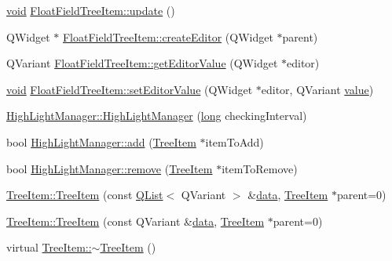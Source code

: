\begin{DoxyCompactItemize}
\item 
\hyperlink{group___u_a_v_objects_plugin_ga444cf2ff3f0ecbe028adce838d373f5c}{void} \hyperlink{group___u_a_v_object_browser_plugin_gaf8663356ac74e46312ee8bdfe6470d74}{Float\-Field\-Tree\-Item\-::update} ()
\item 
Q\-Widget $\ast$ \hyperlink{group___u_a_v_object_browser_plugin_ga2762101ef0435023c73583b23393a8c2}{Float\-Field\-Tree\-Item\-::create\-Editor} (Q\-Widget $\ast$parent)
\item 
Q\-Variant \hyperlink{group___u_a_v_object_browser_plugin_gac22e37813e460949e795d4b18c110293}{Float\-Field\-Tree\-Item\-::get\-Editor\-Value} (Q\-Widget $\ast$editor)
\item 
\hyperlink{group___u_a_v_objects_plugin_ga444cf2ff3f0ecbe028adce838d373f5c}{void} \hyperlink{group___u_a_v_object_browser_plugin_gadf07cae542668ec439bf1514f07e4983}{Float\-Field\-Tree\-Item\-::set\-Editor\-Value} (Q\-Widget $\ast$editor, Q\-Variant \hyperlink{glext_8h_aa0e2e9cea7f208d28acda0480144beb0}{value})
\item 
\hyperlink{group___u_a_v_object_browser_plugin_ga263177a5340ddcc0e376da4c0d40399a}{High\-Light\-Manager\-::\-High\-Light\-Manager} (\hyperlink{ioapi_8h_a3c7b35ad9dab18b8310343c201f7b27e}{long} checking\-Interval)
\item 
bool \hyperlink{group___u_a_v_object_browser_plugin_ga61c9f35430a5668bcab80f6840ea0f93}{High\-Light\-Manager\-::add} (\hyperlink{class_tree_item}{Tree\-Item} $\ast$item\-To\-Add)
\item 
bool \hyperlink{group___u_a_v_object_browser_plugin_gac8c19321b7e84ad6ba7a857cf48b21a8}{High\-Light\-Manager\-::remove} (\hyperlink{class_tree_item}{Tree\-Item} $\ast$item\-To\-Remove)
\item 
\hyperlink{group___u_a_v_object_browser_plugin_gaee288dea1233cde85e888cd709a5385e}{Tree\-Item\-::\-Tree\-Item} (const \hyperlink{class_q_list}{Q\-List}$<$ Q\-Variant $>$ \&\hyperlink{glext_8h_a8850df0785e6fbcc2351af3b686b8c7a}{data}, \hyperlink{class_tree_item}{Tree\-Item} $\ast$parent=0)
\item 
\hyperlink{group___u_a_v_object_browser_plugin_ga18da596c178ccc1c830ac82d1896be1d}{Tree\-Item\-::\-Tree\-Item} (const Q\-Variant \&\hyperlink{glext_8h_a8850df0785e6fbcc2351af3b686b8c7a}{data}, \hyperlink{class_tree_item}{Tree\-Item} $\ast$parent=0)
\item 
virtual \hyperlink{group___u_a_v_object_browser_plugin_ga859429185d908c3e54861bbbfb185425}{Tree\-Item\-::$\sim$\-Tree\-Item} ()
\item 

\end{DoxyCompactItemize}
